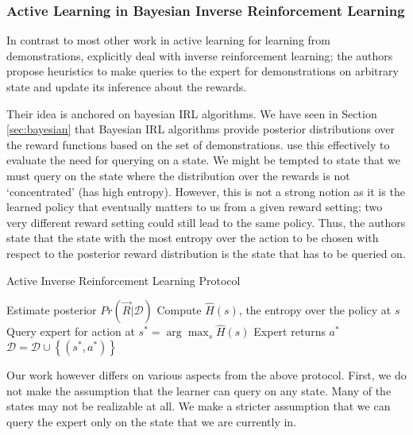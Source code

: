 \subsubsection{Active Learning in Bayesian Inverse Reinforcement Learning}
\label{sec:active_bayesian}
In contrast to most other work in active learning for learning from demonstrations, \citet{Lopes:2009:ALR:1617459.1617463} explicitly deal with inverse reinforcement learning; the authors propose heuristics to make queries to the expert for demonstrations on arbitrary state and update its inference about the rewards. 

Their idea is anchored on bayesian IRL algorithms. We have seen in Section \ref{sec:bayesian} that Bayesian IRL algorithms provide posterior distributions over the reward functions based on the set of demonstrations. \citet{Lopes:2009:ALR:1617459.1617463} use this effectively to evaluate the need for querying on a state. We might be tempted to state that we must query on the state where the distribution over the rewards is not `concentrated' (has high entropy). However, this is not a strong notion as it is the learned policy that eventually matters to us from a given reward setting; two very different reward setting could still lead to  the same policy. Thus, the authors state that the state with the most entropy over the action to be chosen with respect to the posterior reward distribution is the state that has to be queried on. \\


\begin{algorithm}[H]
\caption{ Active Inverse Reinforcement Learning Protocol}
\label{alg:active_irl}
\begin{algorithmic}
\State Estimate posterior $Pr(\vec{R}| \mathcal{D})$
	\State Compute $\hat{H}(s)$, the entropy over the policy at $s$
\EndFor
\State Query expert for action at $s^* = \arg \max_{s} \hat{H}(s)$
\State Expert returns $a^*$
\State $\mathcal{D} = \mathcal{D} \cup \left\lbrace(s^*,a^*)\right\rbrace$ 
\EndWhile
\end{algorithmic}
\end{algorithm}

Our work however differs on various aspects from the above protocol. First, we do not make the assumption that the learner can query on any state. Many of the states may not be realizable at all. We make a stricter assumption that we can query the expert only on the state that we are currently in.

